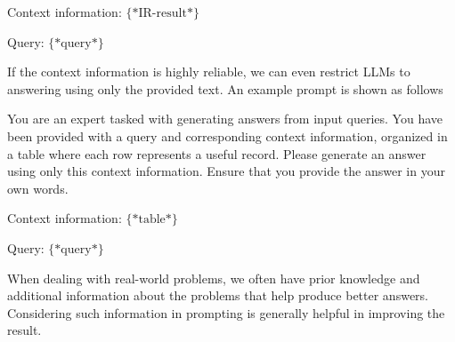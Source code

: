 \begin{itemize}
\begin{tcolorbox}
    Context information: $\{*\mathrm{IR\textrm{-}result}*\}$

    \vspace{0.3em}

    Query: $\{*\mathrm{query}*\}$

    \vspace{0.3em}

    \underline{\hspace{2em}}

    \endgroup

    \end{tcolorbox}
    \vspace{0.5em}

    If the context information is highly reliable, we can even restrict LLMs to answering using only the provided text. An example prompt is shown as follows

    \vspace{0.5em}
    \begin{tcolorbox}

    \begingroup
    \setlength{\leftskip}{2em}
    \setlength{\rightskip}{2em}

    You are an expert tasked with generating answers from input queries. You have been provided with a query and corresponding context information, organized in a table where each row represents a useful record. Please generate an answer using only this context information. Ensure that you provide the answer in your own words.

    \vspace{0.5em}

    Context information: $\{*\mathrm{table}*\}$

    \vspace{0.3em}

    Query: $\{*\mathrm{query}*\}$

    \vspace{0.3em}

    \underline{\hspace{2em}}

    \endgroup

    \end{tcolorbox}
    \vspace{0.5em}

    When dealing with real-world problems, we often have prior knowledge and additional information about the problems that help produce better answers. Considering such information in prompting is generally helpful in improving the result.


\end{itemize}
